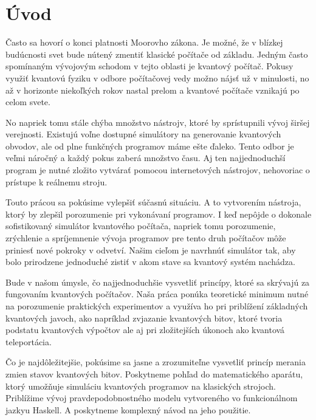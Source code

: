 

\chapter*{Úvod}

Často sa hovorí o konci platnosti Moorovho zákona. Je možné, že v blízkej
budúcnosti svet bude nútený zmentiť klasické počítače od základu. Jedným 
často spomínaným vývojovým schodom v tejto oblasti je kvantový počítač.
Pokusy využiť kvantovú fyziku v odbore počítačovej vedy možno nájsť už v
minulosti, no až v horizonte niekoľkých rokov nastal prelom a kvantové
počítače vznikajú po celom svete.

No napriek tomu stále chýba množstvo nástrojv, ktoré by sprístupnili vývoj
širšej verejnosti. Existujú voľne dostupné simulátory na generovanie kvantových
obvodov, ale od plne funkčných programov máme ešte ďaleko. Tento odbor je 
veľmi náročný a každý pokus zaberá množstvo času. Aj ten najjednoduchší program
je nutné zložito vytvárať pomocou internetových nástrojov, nehovoriac o 
prístupe k reálnemu stroju.

Touto prácou sa pokúsime vylepšiť súčasnú situáciu. A to vytvorením nástroja,
ktorý by zlepšil porozumenie pri vykonávaní programov. I keď nepôjde o 
dokonale sofistikovaný simulátor kvantového počítača, napriek tomu porozumenie,
zrýchlenie a spríjemnenie vývoja programov pre tento druh počítačov môže 
priniesť nové pokroky v odvetví. Našim cieľom je navrhnúť simulátor tak, aby 
bolo prirodzene jednoduché zistiť v akom stave sa kvantový systém nachádza.

Bude v našom úmysle, čo najjednoduchšie vysvetliť princípy, ktoré sa skrývajú
za fungovaním kvantových počítačov. Naša práca ponúka teoretické minimum
nutné na porozumenie praktických experimentov a využíva ho pri priblížení
základných kvantových javoch, ako napríklad zvjazanie kvantových bitov, ktoré 
tvoria podstatu kvantových výpočtov ale aj pri zložitejších úkonoch ako 
kvantová teleportácia.


Čo je najdôležitejšie, pokúsime sa jasne a zrozumiteľne vysvetliť princíp
merania zmien stavov kvantových bitov. Poskytneme pohľad do matematického
aparátu, ktorý umožňuje simuláciu kvantových programov na klasických strojoch.
Priblížime vývoj pravdepodobnostného modelu vytvoreného vo funkcionálnom jazkyu
Haskell. A poskytneme komplexný návod na jeho použitie.
